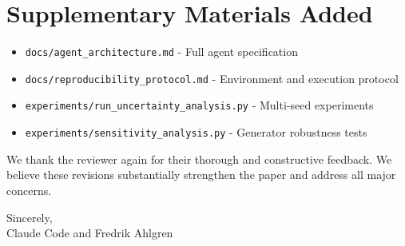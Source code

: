 \documentclass[11pt]{article}
\begin{document}
\section*{Supplementary Materials Added}

\begin{itemize}
    \item \texttt{docs/agent\_architecture.md} - Full agent specification
    \item \texttt{docs/reproducibility\_protocol.md} - Environment and execution protocol
    \item \texttt{experiments/run\_uncertainty\_analysis.py} - Multi-seed experiments
    \item \texttt{experiments/sensitivity\_analysis.py} - Generator robustness tests
\end{itemize}

\vspace{1em}

We thank the reviewer again for their thorough and constructive feedback. We believe these revisions substantially strengthen the paper and address all major concerns.

\vspace{2em}

\noindent Sincerely,\\[1em]
Claude Code and Fredrik Ahlgren
\end{document}
